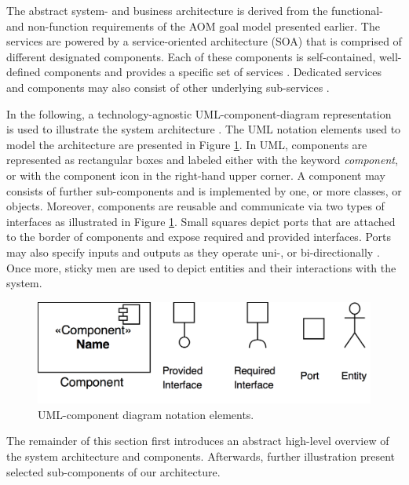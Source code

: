 \documentclass{llncs}
\begin{document}
{			The abstract system- and business architecture is derived from the functional- and non-function requirements of the AOM goal model presented earlier. The services are powered by a service-oriented architecture (SOA) that is comprised of different designated components. Each of these components is self-contained, well-defined components and provides a specific set of services \cite{erl2005service}\cite{perrey2003service}. Dedicated services and components may also consist of other underlying sub-services \cite{rosen2012applied}. 
			
			In the following, a technology-agnostic UML-component-diagram representation is used to illustrate the system architecture \cite{booch1996unified}\cite{specification2007omg}. The UML notation elements used to model the architecture are presented in Figure \ref{fig:uml-component-diagram-overview}. In UML, components are represented as rectangular boxes and labeled either with the keyword \textit{component}, or with the component icon in the right-hand upper corner. A component may consists of further sub-components and is implemented by one, or more classes, or objects. Moreover, components are reusable and communicate via two types of interfaces as illustrated in Figure \ref{fig:uml-component-diagram-overview}. Small squares depict ports that are attached to the border of components and expose required and provided interfaces. Ports may also specify inputs and outputs as they operate uni-, or bi-directionally \cite{booch1996unified}\cite{specification2007omg}. Once more, sticky men are used to depict entities and their interactions with the system. 
			
			\begin{figure}[H]
				\centering
				\includegraphics[scale=0.15]{Figures/UML-notation-elements.png}
				\caption{UML-component diagram notation elements.}	
				\label{fig:uml-component-diagram-overview}
			\end{figure}	
			
			The remainder of this section first introduces an abstract high-level overview of the system architecture and components. Afterwards, further illustration present selected sub-components of our architecture.

}
\end{document}
